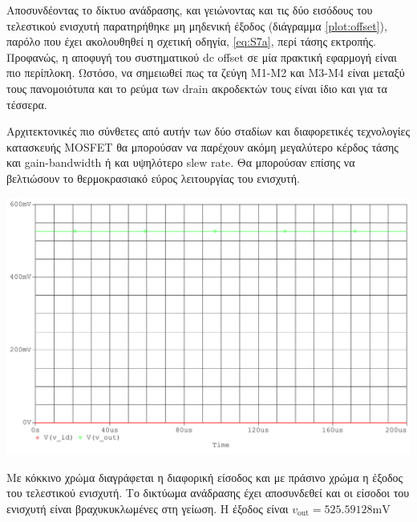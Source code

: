 Αποσυνδέοντας το δίκτυο ανάδρασης, και γειώνοντας και τις δύο εισόδους του τελεστικού ενισχυτή παρατηρήθηκε μη μηδενική έξοδος (διάγραμμα \ref{plot:offset}), παρόλο που έχει ακολουθηθεί η σχετική οδηγία, \eqref{eq:S7a}, περί τάσης εκτροπής. Προφανώς, η αποφυγή του συστηματικού dc offset σε μία πρακτική εφαρμογή είναι πιο περίπλοκη. Ωστόσο, να σημειωθεί πως τα ζεύγη M1-M2 και M3-M4 είναι μεταξύ τους πανομοιότυπα και το ρεύμα των drain ακροδεκτών τους είναι ίδιο και για τα τέσσερα.\par
Αρχιτεκτονικές πιο σύνθετες από αυτήν των δύο σταδίων και διαφορετικές τεχνολογίες κατασκευής MOSFET θα μπορούσαν να παρέχουν ακόμη μεγαλύτερο κέρδος τάσης και gain-bandwidth ή και υψηλότερο slew rate. Θα μπορούσαν επίσης να βελτιώσουν το θερμοκρασιακό εύρος λειτουργίας του ενισχυτή.\par

\begin{center}
	\begin{plotenv}[H]
		\centering
		\includegraphics[width=\linewidth]{op_amp_sim/dc_offset.pdf}
		\caption{Με κόκκινο χρώμα διαγράφεται η διαφορική είσοδος και με πράσινο χρώμα η έξοδος του τελεστικού ενισχυτή. Το δικτύωμα ανάδρασης έχει αποσυνδεθεί και οι είσοδοι του ενισχυτή είναι βραχυκυκλωμένες στη γείωση. Η έξοδος είναι $v_{\mathrm{out}}=525.59128\unit{\milli\volt}$}
		\label{plot:offset}
	\end{plotenv}
\end{center}